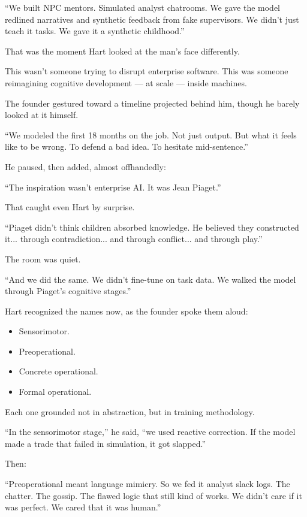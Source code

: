 ``We built NPC mentors. 
Simulated analyst chatrooms. 
We gave the model redlined narratives and synthetic feedback from fake supervisors. 
We didn’t just teach it tasks. 
We gave it a synthetic childhood.''

That was the moment Hart looked at the man’s face differently.

This wasn’t someone trying to disrupt enterprise software. 
This was someone reimagining cognitive development --- at scale --- inside machines.

The founder gestured toward a timeline projected behind him, though he barely looked at it himself.

``We modeled the first 18 months on the job. 
Not just output. 
But what it feels like to be wrong. 
To defend a bad idea. 
To hesitate mid-sentence.''

He paused, then added, almost offhandedly:

``The inspiration wasn’t enterprise AI. It was Jean Piaget.''

That caught even Hart by surprise.

``Piaget didn’t think children absorbed knowledge. 
He believed they constructed it... through contradiction... and through conflict... and through play.''

The room was quiet.

``And we did the same. 
We didn’t fine-tune on task data. 
We walked the model through Piaget’s cognitive stages.''

Hart recognized the names now, as the founder spoke them aloud:
\begin{itemize}
  \item Sensorimotor. 
  \item Preoperational. 
  \item Concrete operational. 
  \item Formal operational.
\end{itemize}

Each one grounded not in abstraction, but in training methodology.

``In the sensorimotor stage,'' 
he said, 
``we used reactive correction. 
If the model made a trade that failed in simulation, it got slapped.''

Then:

``Preoperational meant language mimicry. 
So we fed it analyst slack logs. 
The chatter. 
The gossip. 
The flawed logic that still kind of works. 
We didn’t care if it was perfect. 
We cared that it was human.''

